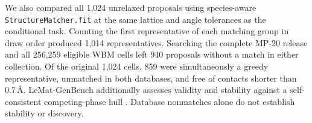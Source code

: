 We also compared all 1,024 unrelaxed proposals using species-aware \texttt{StructureMatcher.fit} at the same lattice and angle tolerances as the conditional task. Counting the first representative of each matching group in draw order produced 1,014 representatives. Searching the complete MP-20 release and all 256,259 eligible WBM cells left 940 proposals without a match in either collection. Of the original 1,024 cells, 859 were simultaneously a greedy representative, unmatched in both databases, and free of contacts shorter than 0.7\,\AA. LeMat-GenBench additionally assesses validity and stability against a self-consistent competing-phase hull \cite{lemat}. Database nonmatches alone do not establish stability or discovery.
